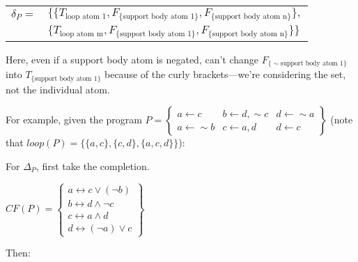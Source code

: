 \documentclass[9pt,a4paper,landscape]{article}
\newcommand{\ngtb}[1]{T_{ \{#1\} }}
\newcommand{\ngfb}[1]{F_{ \{#1\} }}
\newcommand{\ngta}[1]{T_{#1}}
\begin{document}
{\begin{center}
	\begin{tabular}{rl}
		$\delta_P =$ 	& $\{ \{ \ngta{\text{loop atom 1}}, \ngfb{\text{support body atom 1}}, \ngfb{\text{support body atom n}} \},$ \\
						& $\{ \ngta{\text{loop atom m}}, \ngfb{\text{support body atom 1}}, \ngfb{\text{support body atom n}} \} \}$ \\
	\end{tabular}
\end{center}

Here, even if a support body atom is negated, can't change $\ngfb{{\sim} \text{support body atom 1}}$ into $\ngtb{\text{support body atom 1}}$ because of the curly brackets---we're considering the set, not the individual atom.

\vspace{\baselineskip}

For example, given the program $P = \left\{\begin{array}{lll}
a \leftarrow c & b \leftarrow d, {\sim} c & d \leftarrow {\sim} a\\
a \leftarrow {\sim} b & c \leftarrow a, d & d \leftarrow c
\end{array}\right\}$ (note that $loop(P) = \{ \{a, c\}, \{c, d\}, \{a, c, d\} \}$):

For $\Delta_P$, first take the completion.

\begin{center}
	$CF(P) = \left\{\begin{array}{l}
a \leftrightarrow c \lor (\neg b) \\
b \leftrightarrow d \land \neg c \\
c \leftrightarrow a \land d \\
d \leftrightarrow (\neg a) \lor c
\end{array}\right\}$
\end{center}

\pagebreak

Then:

}
\end{document}
